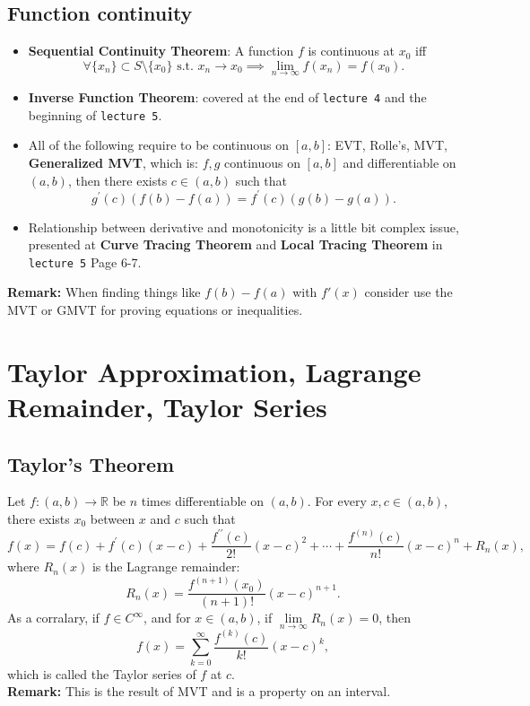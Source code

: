\documentclass[a4paper,10pt]{article}
\newcommand{\R}{\mathbb{R}}
\begin{document}
\subsection{Function continuity}
\begin{itemize}
    \item \textbf{Sequential Continuity Theorem}: A function $f$ is continuous at $x_0$ iff\[
        \forall \{x_n\} \subset S \setminus \{x_0\} \text{ s.t. } x_n\to x_0 
                        \implies \lim\limits_{n\to\infty}f(x_n)=f(x_0).
    \]
    \item \textbf{Inverse Function Theorem}: covered at the end of \texttt{lecture 4} and the beginning of \texttt{lecture 5}.
    \item All of the following require to be continuous on $[a,b]$: EVT, Rolle's, MVT, \textbf{Generalized MVT}, which is: $f,g$ continuous on $[a,b]$
    and differentiable on $(a,b)$, then there exists $c\in(a,b)$ such that\[
        g^\prime(c) (f(b)-f(a)) = f^\prime(c)(g(b)-g(a)).
    \]
    \item Relationship between derivative and monotonicity is a little bit complex issue, presented at 
    \textbf{Curve Tracing Theorem} and \textbf{Local Tracing Theorem} in \texttt{lecture 5} Page 6-7.
\end{itemize}
\textbf{Remark:} When finding things like $f(b)-f(a)$ with $f'(x)$ consider use the MVT or GMVT for proving equations or inequalities.

\newpage

\section{Taylor Approximation, Lagrange Remainder, Taylor Series}
\subsection{Taylor's Theorem}
Let $f:(a,b)\to\R$ be $n$ times differentiable on $(a,b)$. For every $x,c\in(a,b)$, there exists $x_0$
between $x$ and $c$ such that\[
    f(x) = f(c) + f^\prime(c)(x-c) + \frac{f^{\prime\prime}(c)}{2!}(x-c)^2 + \cdots + \frac{f^{(n)}(c)}{n!}(x-c)^n + R_n(x),
\]
where $R_n(x)$ is the Lagrange remainder:
\[
    R_n(x) = \frac{f^{(n+1)}(x_0)}{(n+1)!}(x-c)^{n+1}.
\]
As a corralary, if $f\in C^\infty$, and for $x\in(a,b)$, if $\lim\limits_{n\to\infty}R_n(x)=0$, then\[
    f(x) = \sum_{k=0}^\infty \frac{f^{(k)}(c)}{k!}(x-c)^k,
\]
which is called the Taylor series of $f$ at $c$.\\
\textbf{Remark:} This is the result of MVT and is a property on an interval.
\end{document}
